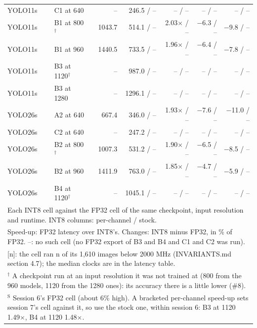 \begin{tabular}{llrrrrr}
YOLO11s & C1 at 640 & -- & 246.5 / -- & -- / -- & -- / -- & -- / -- \\
YOLO11s & B1 at 800$^{\dagger}$ & 1043.7 & 514.1 / -- & 2.03$\times$ / -- & $-$6.3 / -- & $-$9.8 / -- \\
YOLO11s & B1 at 960 & 1440.5 & 733.5 / -- & 1.96$\times$ / -- & $-$6.4 / -- & $-$7.8 / -- \\
YOLO11s & B3 at 1120$^{\dagger}$ & -- & 987.0 / -- & -- / -- & -- / -- & -- / -- \\
YOLO11s & B3 at 1280 & -- & 1296.1 / -- & -- / -- & -- / -- & -- / -- \\
YOLO26s & A2 at 640 & 667.4 & 346.0 / -- & 1.93$\times$ / -- & $-$7.6 / -- & $-$11.0 / -- \\
YOLO26s & C2 at 640 & -- & 247.2 / -- & -- / -- & -- / -- & -- / -- \\
YOLO26s & B2 at 800$^{\dagger}$ & 1007.3 & 531.2 / -- & 1.90$\times$ / -- & $-$6.5 / -- & $-$8.5 / -- \\
YOLO26s & B2 at 960 & 1411.9 & 763.0 / -- & 1.85$\times$ / -- & $-$4.7 / -- & $-$5.9 / -- \\
YOLO26s & B4 at 1120$^{\dagger}$ & -- & 1045.1 / -- & -- / -- & -- / -- & -- / -- \\
\bottomrule
\multicolumn{7}{l}{\footnotesize Each INT8 cell against the FP32 cell of the same checkpoint, input resolution and runtime. INT8 columns: per-channel / stock.} \\
\multicolumn{7}{l}{\footnotesize Speed-up: FP32 latency over INT8's. Changes: INT8 minus FP32, in \% of FP32. --: no such cell (no FP32 export of B3 and B4 and C1 and C2 was run).} \\
\multicolumn{7}{l}{\footnotesize [n]: the cell ran n of its 1,610 images below 2000 MHz (INVARIANTS.md section 4.7); the median clocks are in the latency table.} \\
\multicolumn{7}{l}{\footnotesize $^{\dagger}$ A checkpoint run at an input resolution it was not trained at (800 from the 960 models, 1120 from the 1280 ones): its accuracy there is a little lower (\#8).} \\
\multicolumn{7}{l}{\footnotesize $^{\mathrm{S}}$ Session 6's FP32 cell (about 6\% high). A bracketed per-channel speed-up sets session 7's cell against it, so use the stock one, within session 6: B3 at 1120 1.49$\times$, B4 at 1120 1.48$\times$.} \\
\end{tabular}
